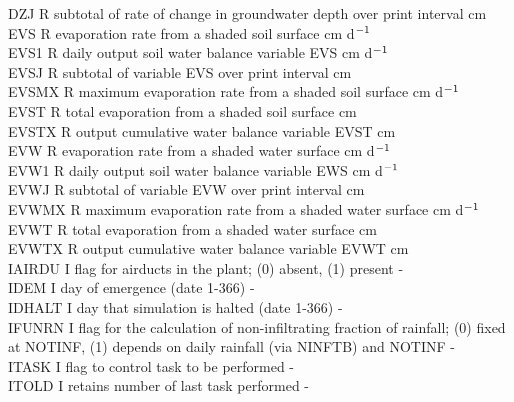 \documentclass[11pt]{article}
\begin{document}
\begin{tabbing}
DZJ\> \> R\> subtotal of rate of change in groundwater depth over print interval\> \> \> \> \> \> \> cm\\
EVS\> \> R\> evaporation rate from a shaded soil surface\> \> \> \> \> \> \> cm d$^{{\rm -1}}$\\
EVS1\> \> R\> daily output soil water balance variable EVS\> \> \> \> \> \> \> cm d$^{{\rm -1}}$\\
EVSJ\> \> R\> subtotal of variable EVS over print interval\> \> \> \> \> \> \> cm \\
EVSMX\> \> R\> maximum evaporation rate from a shaded soil surface\> \> \> \> \> \> \> cm d$^{{\rm -1}}$\\
EVST\> \> R\> total evaporation from a shaded soil surface\> \> \> \> \> \> \> cm\\
EVSTX\> \> R\> output cumulative water balance variable EVST\> \> \> \> \> \> \> cm\\
EVW\> \> R\> evaporation rate from a shaded water surface\> \> \> \> \> \> \> cm d$^{{\rm -1}}$\\
EVW1\> \> R\> daily output soil water balance variable EWS\> \> \> \> \> \> \> cm d$^{{\rm -1}}$\\
EVWJ\> \> R\> subtotal of variable EVW over print interval\> \> \> \> \> \> \> cm \\
EVWMX\> \> R\> maximum evaporation rate from a shaded water surface\> \> \> \> \> \> \> cm d$^{{\rm -1}}$\\
EVWT\> \> R\> total evaporation from a shaded water surface\> \> \> \> \> \> \> cm\\
EVWTX\> \> R\> output cumulative water balance variable EVWT\> \> \> \> \> \> \> cm\\
IAIRDU\> \> I\> flag for airducts in the plant; (0) absent, (1) present\> \> \> \> \> \> \> -\\
IDEM\> \> I\> day of emergence (date 1-366)\> \> \> \> \> \> \> -\\
IDHALT\> \> I\> day that simulation is halted (date 1-366)\> \> \> \> \> \> \> -\\
IFUNRN\> \> I\> flag for the calculation of non-infiltrating fraction of rainfall; (0) fixed\\
 \>\> \> at NOTINF, (1) depends on daily rainfall (via NINFTB) and NOTINF\> \> \> \> \> \> \> -\\
ITASK\> \> I\> flag to control task to be performed\> \> \> \> \> \> \> -\\
ITOLD\> \> I\> retains number of last task performed\> \> \> \> \> \> \> -\\

\end{tabbing}
\end{document}
